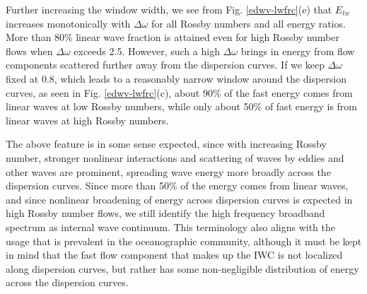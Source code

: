 \documentclass[../Rajarshi-thesis-draft.tex]{subfiles}
\begin{document}
    
    Further increasing the window width, we see from  Fig. \ref{edwv-lwfrc}(e) that $E_{lw}$ increases monotonically with $\Delta\omega$ for all Rossby numbers and all energy ratios. More than 80\% linear wave fraction is attained even for high Rossby number flows when $\Delta\omega$ exceeds 2.5. However, such a high $\Delta\omega$ brings in energy from flow components scattered further away from the dispersion curves. If we keep $\Delta\omega$ fixed at 0.8, which leads to a reasonably narrow window   around the dispersion curves, as seen in Fig. \ref{edwv-lwfrc}(c), about 90\% of the fast energy comes from linear waves at low Rossby numbers, while only about 50\% of fast energy is from linear waves at high Rossby numbers. 
       
    The above feature is in some sense expected, since with increasing Rossby number, stronger nonlinear interactions and scattering of waves by eddies and other waves are prominent, spreading wave energy more broadly across the dispersion curves. Since more than 50\% of the energy comes from linear waves, and since nonlinear broadening of energy across dispersion curves is expected in high Rossby number flows, we still identify the high frequency broadband spectrum as internal wave continuum.  This terminology also aligns with the usage that is prevalent in the oceanographic community, although it must be kept in mind that  the fast flow component that makes up the IWC is not localized along dispersion curves, but rather  has some non-negligible distribution of energy across the dispersion curves. 
    
    
    
    
    
    
\end{document}
